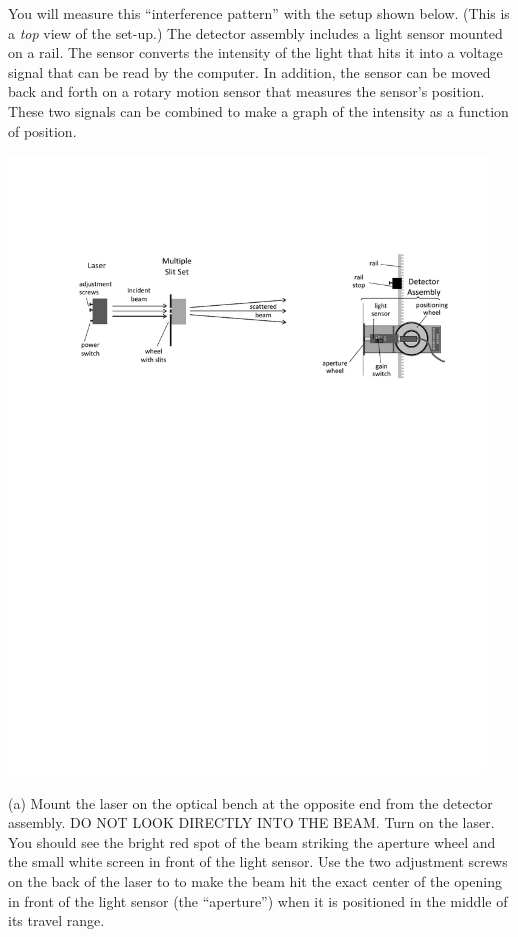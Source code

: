 You will measure this ``interference pattern'' with the setup shown below. 
(This is a \textit{top} view of the set-up.) 
The detector assembly includes a light sensor mounted on a rail. The sensor converts the intensity 
of the light that hits it into a voltage signal that can be read by the
computer. In addition, the sensor can be moved back and
forth on a rotary motion sensor that measures the sensor's position. These two signals can be combined to
make a graph of the intensity as a function of position.

{\centering \includegraphics[width=0.95\textwidth]{interference_of_light/apparatus.pdf} \par}
\label{figure_rail_stop}

(a) Mount the laser on the 
optical bench at the opposite end from the detector assembly.
DO NOT LOOK DIRECTLY INTO
THE BEAM.  Turn on the
laser.  You should see the bright red spot of the beam striking
the aperture wheel and the small white screen in front of the light sensor. 
Use the two adjustment screws on the back of the laser to to make the beam hit the exact center of the opening in front of the light sensor (the ``aperture'') when it is positioned in the middle of its travel range.  

